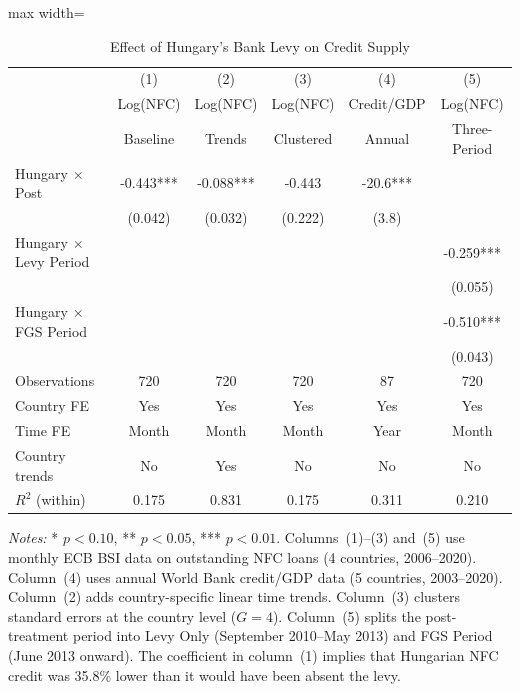 \begin{table}[H]
\centering
\caption{Effect of Hungary's Bank Levy on Credit Supply}
\label{tab:main}
\small
\begin{adjustbox}{max width=\textwidth}
\begin{tabular}{lccccc}
\toprule
 & (1) & (2) & (3) & (4) & (5) \\
 & Log(NFC) & Log(NFC) & Log(NFC) & Credit/GDP & Log(NFC) \\
 & Baseline & Trends & Clustered & Annual & Three-Period \\
\midrule
Hungary $\times$ Post & -0.443*** & -0.088*** & -0.443 & -20.6*** & \\
 & (0.042) & (0.032) & (0.222) & (3.8) & \\
\addlinespace
Hungary $\times$ Levy Period & & & & & -0.259*** \\
 & & & & & (0.055) \\
Hungary $\times$ FGS Period & & & & & -0.510*** \\
 & & & & & (0.043) \\
\addlinespace
\midrule
Observations & 720 & 720 & 720 & 87 & 720 \\
Country FE & Yes & Yes & Yes & Yes & Yes \\
Time FE & Month & Month & Month & Year & Month \\
Country trends & No & Yes & No & No & No \\
$R^2$ (within) & 0.175 & 0.831 & 0.175 & 0.311 & 0.210 \\
\bottomrule
\end{tabular}
\end{adjustbox}
\par\vspace{0.3em}
{\footnotesize \textit{Notes:} * $p<0.10$, ** $p<0.05$, *** $p<0.01$.
Columns~(1)--(3) and~(5) use monthly ECB BSI data on outstanding NFC loans
(4 countries, 2006--2020). Column~(4) uses annual World Bank credit/GDP data
(5 countries, 2003--2020). Column~(2) adds country-specific linear time trends.
Column~(3) clusters standard errors at the country level ($G=4$).
Column~(5) splits the post-treatment period into Levy Only
(September 2010--May 2013) and FGS Period (June 2013 onward).
The coefficient in column~(1) implies that Hungarian NFC credit was
35.8\% lower than it would have been absent the levy.}
\end{table}
